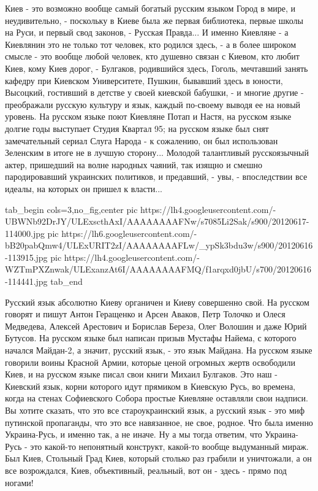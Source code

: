Киев - это возможно вообще самый богатый русским
языком Город в мире, и неудивительно, - поскольку в Киеве была же первая библиотека, первые школы
на Руси, и первый свод законов, - Русская Правда... И именно Киевляне - а
Киевлянин это не только тот человек, кто родился здесь, - а в более широком
смысле - это вообще любой человек, кто душевно связан с Киевом, кто любит Киев,
кому Киев дорог, - Булгаков, родившийся здесь, Гоголь, мечтавший занять кафедру
при Киевском Университете, Пушкин, бывавший здесь в юности, Высоцкий, гостивший
в детстве у своей киевской бабушки, - и многие другие - преображали русскую
культуру и язык, каждый по-своему выводя ее на новый уровень.  На русском языке
поют Киевляне Потап и Настя, на русском языке долгие годы выступает Студия
Квартал 95; на русском языке был снят замечательный сериал Слуга Народа - к
сожалению, он был использован Зеленским в итоге не в лучшую сторону... Молодой
талантливый русскоязычный актер, пришедший на волне народных чаяний, так изящно
и смешно пародировавший украинских политиков, и предавший, - увы, -
впоследствии все идеалы, на которых он пришел к власти...    

\ifcmt
  tab_begin cols=3,no_fig,center
     pic https://lh4.googleusercontent.com/-UBWNb92DrJY/ULExscthAxI/AAAAAAAAFNw/s7085Li2Sak/s900/20120617-114000.jpg
		 pic https://lh6.googleusercontent.com/-bB20pabQmw4/ULExURIT2zI/AAAAAAAAFLw/_ypSk3bdu3w/s900/20120616-113915.jpg
		 pic https://lh4.googleusercontent.com/-WZTmPXZnwak/ULExanzAt6I/AAAAAAAAFMQ/f1arqxd0jbU/s700/20120616-114441.jpg
  tab_end
\fi

Русский язык абсолютно Киеву органичен и Киеву совершенно свой. На русском
говорят и пишут Антон Геращенко и Арсен Аваков, Петр Толочко и Олеся Медведева,
Алексей Арестович и Борислав Береза, Олег Волошин и даже Юрий Бутусов. На
русском языке был написан призыв Мустафы Найема, с которого начался Майдан-2, а
значит, русский язык, - это язык Майдана.  На русском языке говорили воины
Красной Армии, которые ценой огромных жертв освободили Киев, и на русском языке
писал свои книги Михаил Булгаков. Это наш - Киевский язык, корни которого идут
прямиком в Киевскую Русь, во времена, когда на стенах Софиевского Собора
простые Киевляне оставляли свои надписи. Вы хотите сказать, что это все
староукраинский язык, а русский язык - это миф путинской пропаганды, что это
все навязанное, не свое, родное. Что была именно Украина-Русь, и именно так, а
не иначе.  Ну а мы тогда ответим, что Украина-Русь - это какой-то непонятный
конструкт, какой-то вообще выдуманный мираж. Был Киев, Стольный Град Киев,
который столько раз грабили и уничтожали, а он все возрождался, Киев,
объективный, реальный, вот он - здесь - прямо под ногами! 

